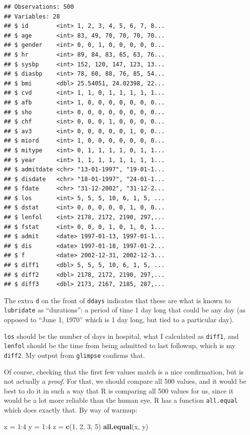 \documentclass[]{tufte-book}
\newenvironment{Shaded}{}{}
\newcommand{\DecValTok}[1]{\textcolor[rgb]{0.25,0.63,0.44}{#1}}
\newcommand{\KeywordTok}[1]{\textcolor[rgb]{0.00,0.44,0.13}{\textbf{#1}}}
\newcommand{\NormalTok}[1]{#1}
\newcommand{\OperatorTok}[1]{\textcolor[rgb]{0.40,0.40,0.40}{#1}}
\newcommand{\StringTok}[1]{\textcolor[rgb]{0.25,0.44,0.63}{#1}}
\theoremstyle{definition}
\theoremstyle{definition}
\theoremstyle{definition}
\theoremstyle{remark}
\begin{document}
\begin{verbatim}
## Observations: 500
## Variables: 28
## $ id        <int> 1, 2, 3, 4, 5, 6, 7, 8...
## $ age       <int> 83, 49, 70, 70, 70, 70...
## $ gender    <int> 0, 0, 1, 0, 0, 0, 0, 0...
## $ hr        <int> 89, 84, 83, 65, 63, 76...
## $ sysbp     <int> 152, 120, 147, 123, 13...
## $ diasbp    <int> 78, 60, 88, 76, 85, 54...
## $ bmi       <dbl> 25.54051, 24.02398, 22...
## $ cvd       <int> 1, 1, 0, 1, 1, 1, 1, 1...
## $ afb       <int> 1, 0, 0, 0, 0, 0, 0, 0...
## $ sho       <int> 0, 0, 0, 0, 0, 0, 0, 0...
## $ chf       <int> 0, 0, 0, 1, 0, 0, 0, 0...
## $ av3       <int> 0, 0, 0, 0, 0, 1, 0, 0...
## $ miord     <int> 1, 0, 0, 0, 0, 0, 0, 0...
## $ mitype    <int> 0, 1, 1, 1, 1, 0, 1, 1...
## $ year      <int> 1, 1, 1, 1, 1, 1, 1, 1...
## $ admitdate <chr> "13-01-1997", "19-01-1...
## $ disdate   <chr> "18-01-1997", "24-01-1...
## $ fdate     <chr> "31-12-2002", "31-12-2...
## $ los       <int> 5, 5, 5, 10, 6, 1, 5, ...
## $ dstat     <int> 0, 0, 0, 0, 0, 1, 0, 0...
## $ lenfol    <int> 2178, 2172, 2190, 297,...
## $ fstat     <int> 0, 0, 0, 1, 0, 1, 0, 1...
## $ admit     <date> 1997-01-13, 1997-01-1...
## $ dis       <date> 1997-01-18, 1997-01-2...
## $ f         <date> 2002-12-31, 2002-12-3...
## $ diff1     <dbl> 5, 5, 5, 10, 6, 1, 5, ...
## $ diff2     <dbl> 2178, 2172, 2190, 297,...
## $ diff3     <dbl> 2173, 2167, 2185, 287,...
\end{verbatim}

The extra \texttt{d} on the front of \texttt{ddays} indicates that these
are what is known to \texttt{lubridate} as ``durations'': a period of
time 1 day long that could be any day (as opposed to ``June 1, 1970''
which is 1 day long, but tied to a particular day).

\texttt{los} should be the number of days in hospital, what I calculated
as \texttt{diff1}, and \texttt{lenfol} should be the time from being
admitted to last followup, which is my \texttt{diff2}. My output from
\texttt{glimpse} confirms that.

Of course, checking that the first few values match is a nice
confirmation, but is not actually a \emph{proof}. For that, we should
compare all 500 values, and it would be best to do it in such a way that
R is comparing all 500 values for us, since it would be a lot more
reliable than the human eye. R has a function \texttt{all.equal} which
does exactly that. By way of warmup:

\begin{Shaded}
\begin{Highlighting}[]
\NormalTok{x =}\StringTok{ }\DecValTok{1}\OperatorTok{:}\DecValTok{4}
\NormalTok{y =}\StringTok{ }\DecValTok{1}\OperatorTok{:}\DecValTok{4}
\NormalTok{z =}\StringTok{ }\KeywordTok{c}\NormalTok{(}\DecValTok{1}\NormalTok{, }\DecValTok{2}\NormalTok{, }\DecValTok{3}\NormalTok{, }\DecValTok{5}\NormalTok{)}
\KeywordTok{all.equal}\NormalTok{(x, y)}
\end{Highlighting}
\end{Shaded}
\end{document}
